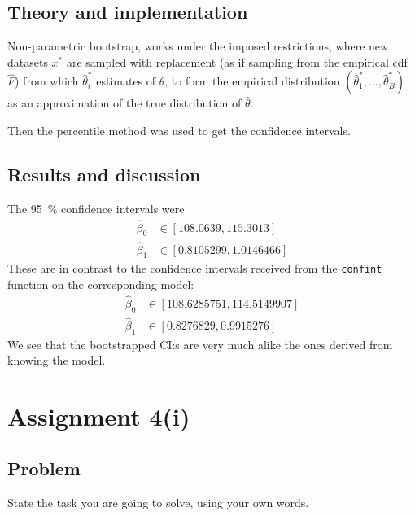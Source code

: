 \documentclass[11pt, a4paper]{article}
\begin{document}
\subsection{Theory and implementation}
Non-parametric bootstrap, works under the imposed restrictions, where
new datasets $x^*$ are sampled with replacement
(as if sampling from the empirical cdf $\hat F$)
from which $\hat\theta^*_i$ estimates of $\theta$,
to form the empirical distribution $(\hat\theta^*_1, \ldots, \hat\theta^*_B)$
as an approximation of the true distribution of $\hat\theta$.

Then the percentile method was used to get the confidence intervals.
\subsection{Results and discussion}
The \SI{95}{\percent} confidence intervals were
\begin{align*}
	\hat\beta_0 &\in [\num[round-mode = places]{108.0639}, \num[round-mode = places]{115.3013}] \\
	\hat\beta_1 &\in [\num[round-mode = places]{0.8105299}, \num[round-mode = places]{1.0146466}]
\end{align*}
These are in contrast to the confidence intervals received from the \texttt{confint} function
on the corresponding model:
\begin{align*}
	\hat\beta_0 &\in [\num[round-mode = places]{108.6285751}, \num[round-mode = places]{114.5149907}] \\
	\hat\beta_1 &\in [\num[round-mode = places]{0.8276829}, \num[round-mode = places]{0.9915276}]
\end{align*}
We see that the bootstrapped CI:s are very much alike the ones derived from
knowing the model.

\section{Assignment 4(i)}
\subsection{Problem}
State the task you are going to solve, using your own words.
\end{document}
